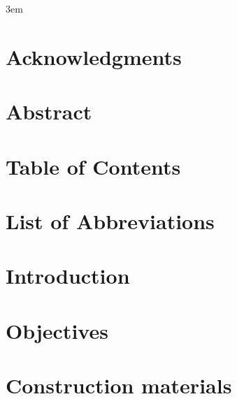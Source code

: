 \documentclass[10pt,twoside]{book}
\begin{document}
\emergencystretch 3em

\frontmatter



\chapter{Acknowledgments}
% 
\clearpage

\chapter{Abstract}
% 
\clearpage

\chapter{Table of Contents}
\tableofcontents %
\clearpage



\chapter{List of Abbreviations}

\clearpage

\mainmatter

\chapter{Introduction}
\clearpage


\clearpage

\chapter{Objectives}
\clearpage

% 
\clearpage

\chapter{Construction materials}
\clearpage
\end{document}
